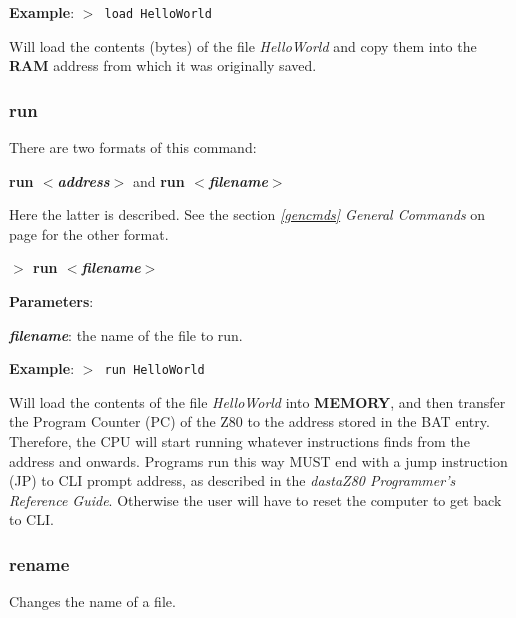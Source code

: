 \documentclass[a4paper,11pt]{article}
\begin{document}
        \textbf{Example}: \texttt{$>$ load HelloWorld}

        Will load the contents (bytes) of the file \textit{HelloWorld} and copy
        them into the \textbf{RAM} address from which it was originally saved.

        \subsubsection{{\color{blue}run}}
        There are two formats of this command:

        \textbf{run \textit{$<$address$>$}} and \textbf{run 
        \textit{$<$filename$>$}}
        
        Here the latter is described. See the section \textit{\ref{gencmds}
        General Commands} on page \pageref{gencmds} for the other format.

        \hspace{1.9cm}\textbf{$>$ run \textit{$<$filename$>$}}

        \textbf{Parameters}:

        \hspace{1cm}\textbf{\textit{filename}}: the name of the file to run.
        
        \textbf{Example}: \texttt{$>$ run HelloWorld}

        Will load the contents of the file \textit{HelloWorld} into
        \textbf{MEMORY}, and then transfer the Program Counter (PC) of the Z80
        to the address stored in the BAT entry. Therefore, the CPU will start
        running whatever instructions finds from the address and onwards.
        Programs run this way MUST end with a jump instruction (JP) to CLI
        prompt address, as described in the \textit{dastaZ80 Programmer’s
        Reference Guide}\cite{dastaz80progref}. Otherwise the user will have to
        reset the computer to get back to CLI.

        \subsubsection{{\color{blue}rename}}
        Changes the name of a file.
\end{document}
